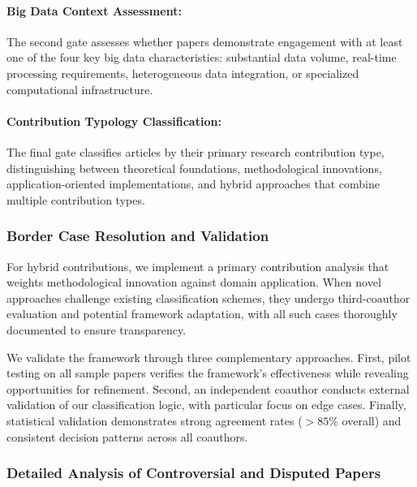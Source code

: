 \documentclass[acmsmall]{acmart}
\begin{document}
\paragraph{Big Data Context Assessment:}
The second gate assesses whether papers demonstrate engagement with at least one of the four key big data characteristics: substantial data volume, real-time processing requirements, heterogeneous data integration, or specialized computational infrastructure.

\paragraph{Contribution Typology Classification:}
The final gate classifies articles by their primary research contribution type, distinguishing between theoretical foundations, methodological innovations, application-oriented implementations, and hybrid approaches that combine multiple contribution types.

\subsubsection{Border Case Resolution and Validation}\label{subsubsec:phase-2-literature-search-and-study-selection:border-case-resolution-and-validation}
For hybrid contributions, we implement a primary contribution analysis that weights methodological innovation against domain application. When novel approaches challenge existing classification schemes, they undergo third-coauthor evaluation and potential framework adaptation, with all such cases thoroughly documented to ensure transparency.

We validate the framework through three complementary approaches. First, pilot testing on all sample papers verifies the framework's effectiveness while revealing opportunities for refinement. Second, an independent coauthor conducts external validation of our classification logic, with particular focus on edge cases. Finally, statistical validation demonstrates strong agreement rates ($> 85\%$ overall) and consistent decision patterns across all coauthors.

\subsubsection{Detailed Analysis of Controversial and Disputed Papers}\label{subsubsec:phase-2-literature-search-and-study-selection:detailed-analysis-of-controversial-and-disputed-papers}
\end{document}
